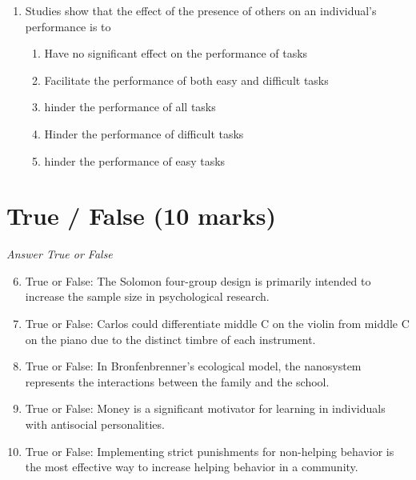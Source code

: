 \documentclass[12pt]{article}
\begin{document}
\begin{enumerate}[label=\arabic*.]
\begin{enumerate}[label=(\alph*)]
    \item Phonemes from the language most frequently spoken around the child.
    \item Phonetic sounds specific to the child's geographical location.
    \item Phonemes from the parents' native language only.
    \item morphemes that the child has heard most frequently.
\end{enumerate}
\item Studies show that the effect of the presence of others on an individual's performance is to
\begin{enumerate}[label=(\alph*)]
    \item Have no significant effect on the performance of tasks
    \item Facilitate the performance of both easy and difficult tasks
    \item hinder the performance of all tasks
    \item Hinder the performance of difficult tasks
    \item hinder the performance of easy tasks
\end{enumerate}
\end{enumerate}

\section*{True / False (10 marks)}
\textit{Answer True or False}
\begin{enumerate}[label=\arabic*.]
\setcounter{enumi}{5}
\item True or False: The Solomon four-group design is primarily intended to increase the sample size in psychological research.
\item True or False: Carlos could differentiate middle C on the violin from middle C on the piano due to the distinct timbre of each instrument.
\item True or False: In Bronfenbrenner's ecological model, the nanosystem represents the interactions between the family and the school.
\item True or False: Money is a significant motivator for learning in individuals with antisocial personalities.
\item True or False: Implementing strict punishments for non-helping behavior is the most effective way to increase helping behavior in a community.
\end{enumerate}
\end{document}
